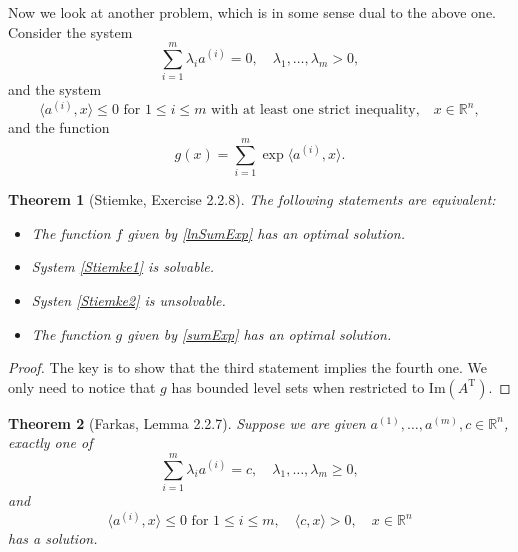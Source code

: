 \documentclass[openany]{book}
\newtheorem{theorem}{Theorem}[chapter]
\theoremstyle{definition}
\theoremstyle{remark}
\begin{document}
Now we look at another problem, which is in some sense dual to the above one. Consider the system
\begin{equation}\label{Stiemke1}
    \sum_{i=1}^{m}\lambda_ia^{(i)}=0,\quad\lambda_1,\ldots,\lambda_m>0,
\end{equation}
and the system
\begin{equation}\label{Stiemke2}
    \langle a^{(i)},x\rangle\le0\textrm{ for }1\le i\le m\textrm{ with at least one strict inequality,}\quad x\in \mathbb{R}^n,
\end{equation}
and the function
\begin{equation}\label{sumExp}
    g(x)=\sum_{i=1}^{m}\exp \langle a^{(i)},x\rangle.
\end{equation}
\begin{theorem}[Stiemke, \cite{BL10} Exercise 2.2.8]\label{thm:Stiemke}
    The following statements are equivalent:
    \begin{itemize}
        \item The function $f$ given by \eqref{lnSumExp} has an optimal solution.
        \item System \eqref{Stiemke1} is solvable.
        \item Systen \eqref{Stiemke2} is unsolvable.
        \item The function $g$ given by \eqref{sumExp} has an optimal solution.
    \end{itemize}
\end{theorem}
\begin{proof}
    The key is to show that the third statement implies the fourth one. We only need to notice that $g$ has bounded level sets when restricted to $\mathrm{Im}(A^{\mathrm{T}})$.
\end{proof}
\begin{theorem}[Farkas, \cite{BL10} Lemma 2.2.7]
    Suppose we are given $a^{(1)},\ldots,a^{(m)},c\in \mathbb{R}^n$, exactly one of
    \begin{equation}
        \sum_{i=1}^{m}\lambda_ia^{(i)}=c,\quad \lambda_1,\ldots,\lambda_m\ge0,
    \end{equation}
    and
    \begin{equation}
        \langle a^{(i)},x\rangle\le0\textrm{ for }1\le i\le m,\quad \langle c,x\rangle>0,\quad x\in \mathbb{R}^n
    \end{equation}
    has a solution.
\end{theorem}
\end{document}
